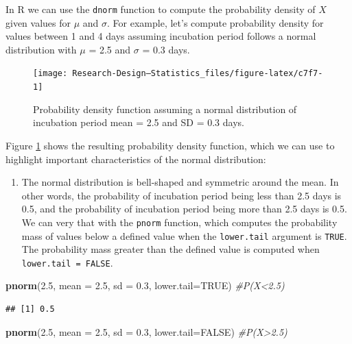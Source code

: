 \documentclass[
]{book}
\newenvironment{Shaded}{\begin{snugshade}}{\end{snugshade}}
\newcommand{\AttributeTok}[1]{\textcolor[rgb]{0.13,0.29,0.53}{#1}}
\newcommand{\CommentTok}[1]{\textcolor[rgb]{0.56,0.35,0.01}{\textit{#1}}}
\newcommand{\ConstantTok}[1]{\textcolor[rgb]{0.56,0.35,0.01}{#1}}
\newcommand{\FloatTok}[1]{\textcolor[rgb]{0.00,0.00,0.81}{#1}}
\newcommand{\FunctionTok}[1]{\textcolor[rgb]{0.13,0.29,0.53}{\textbf{#1}}}
\newcommand{\NormalTok}[1]{#1}
\providecommand{\tightlist}{%
  \setlength{\itemsep}{0pt}\setlength{\parskip}{0pt}}
\begin{document}
In R we can use the \texttt{dnorm} function to compute the probability density of \(X\) given values for \(\mu\) and \(\sigma\). For example, let's compute probability density for values between 1 and 4 days assuming incubation period follows a normal distribution with \(\mu\) = 2.5 and \(\sigma\) = 0.3 days.

\begin{figure}

{\centering \texttt{[image: Research-Design---Statistics\_files/figure-latex/c7f7-1]} 

}

\caption{Probability density function assuming a normal distribution of incubation period mean = 2.5 and SD = 0.3 days.}\label{fig:c7f7}
\end{figure}

Figure \ref{fig:c7f7} shows the resulting probability density function, which we can use to highlight important characteristics of the normal distribution:

\begin{enumerate}
\def\labelenumi{\arabic{enumi}.}
\tightlist
\item
  The normal distribution is bell-shaped and symmetric around the mean. In other words, the probability of incubation period being less than 2.5 days is 0.5, and the probability of incubation period being more than 2.5 days is 0.5. We can very that with the \texttt{pnorm} function, which computes the probability mass of values below a defined value when the \texttt{lower.tail} argument is \texttt{TRUE}. The probability mass greater than the defined value is computed when \texttt{lower.tail\ =\ FALSE}.
\end{enumerate}

\begin{Shaded}
\begin{Highlighting}[]
\FunctionTok{pnorm}\NormalTok{(}\FloatTok{2.5}\NormalTok{, }\AttributeTok{mean =} \FloatTok{2.5}\NormalTok{, }\AttributeTok{sd =} \FloatTok{0.3}\NormalTok{, }\AttributeTok{lower.tail=}\ConstantTok{TRUE}\NormalTok{) }\CommentTok{\#P(X\textless{}2.5)}
\end{Highlighting}
\end{Shaded}

\begin{verbatim}
## [1] 0.5
\end{verbatim}

\begin{Shaded}
\begin{Highlighting}[]
\FunctionTok{pnorm}\NormalTok{(}\FloatTok{2.5}\NormalTok{, }\AttributeTok{mean =} \FloatTok{2.5}\NormalTok{, }\AttributeTok{sd =} \FloatTok{0.3}\NormalTok{, }\AttributeTok{lower.tail=}\ConstantTok{FALSE}\NormalTok{) }\CommentTok{\#P(X\textgreater{}2.5)}
\end{Highlighting}
\end{Shaded}
\end{document}
